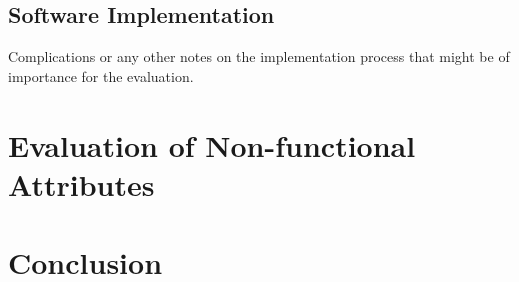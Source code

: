 \subsection{Software Implementation}
\label{software_implementation}
Complications or any other notes on the implementation process that might be of
importance for the evaluation.





\section{Evaluation of Non-functional Attributes}
\label{evaluation_nonfunctional}





\section{Conclusion}
\label{conclusion}




